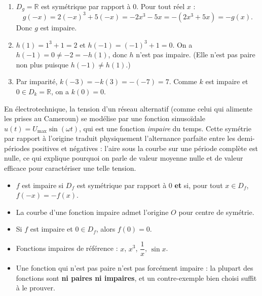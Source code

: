 \documentclass[11pt]{article}
\newcommand{\cle}[1]{{\popxbold\color{popdark}#1}}
\begin{document}
\begin{corrige}[Exercice n°1]
\begin{enumerate}
\item $D_g = \mathbb{R}$ est symétrique par rapport à $0$. Pour tout réel $x$ :
\[ g(-x) = 2(-x)^3 + 5(-x) = -2x^3 - 5x = -(2x^3 + 5x) = -g(x). \]
Donc $g$ est impaire.
\item $h(1) = 1^3 + 1 = 2$ et $h(-1) = (-1)^3 + 1 = 0$. On a $h(-1) = 0 \neq -2 = -h(1)$, donc $h$ n'est pas impaire. (Elle n'est pas paire non plus puisque $h(-1) \neq h(1)$.)
\item Par imparité, $k(-3) = -k(3) = -(-7) = 7$. Comme $k$ est impaire et $0 \in D_k = \mathbb{R}$, on a $k(0) = 0$.
\end{enumerate}
\end{corrige}

\begin{savaistu}
En électrotechnique, la tension d'un réseau alternatif (comme celui qui alimente les prises au Cameroun) se modélise par une fonction sinusoïdale $u(t) = U_{\max}\sin(\omega t)$, qui est une fonction \emph{impaire} du temps. Cette symétrie par rapport à l'origine traduit physiquement l'alternance parfaite entre les demi-périodes positives et négatives : l'aire sous la courbe sur une période complète est nulle, ce qui explique pourquoi on parle de valeur moyenne nulle et de valeur efficace pour caractériser une telle tension.
\end{savaistu}

\begin{aretenir}
\begin{itemize}
\item $f$ est \cle{impaire} si $D_f$ est symétrique par rapport à $0$ \textbf{et} si, pour tout $x \in D_f$, $f(-x) = -f(x)$.
\item La courbe d'une fonction impaire admet l'\cle{origine} $O$ pour \cle{centre de symétrie}.
\item Si $f$ est impaire et $0 \in D_f$, alors $f(0) = 0$.
\item Fonctions impaires de référence : $x$, $x^3$, $\dfrac{1}{x}$, $\sin x$.
\item Une fonction qui n'est pas paire n'est pas forcément impaire : la plupart des fonctions sont \textbf{ni paires ni impaires}, et un contre-exemple bien choisi suffit à le prouver.
\end{itemize}
\end{aretenir}
\end{document}
